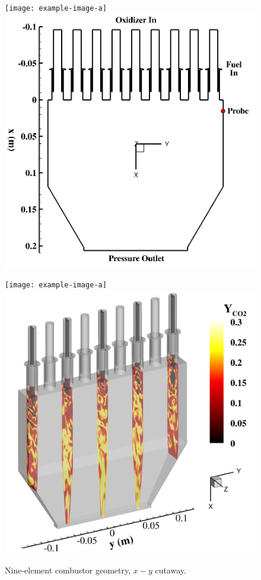\begin{figure}
	\begin{minipage}{0.49\linewidth}
		\ifdefined\DRAFT
			\texttt{[image: example-image-a]}
		\else
			\includegraphics[width=0.99\linewidth]{Chapters/HPROMResults/Images/nineElem/geom_xy.png}
		\fi
		\caption{\label{fig:nineElemGeomXY}Nine-element combustor geometry, $x-y$ cutaway.}
	\end{minipage}
	\begin{minipage}{0.49\linewidth}
		\ifdefined\DRAFT
			\texttt{[image: example-image-a]}
		\else
			\includegraphics[width=0.99\linewidth]{Chapters/HPROMResults/Images/nineElem/geom_iso.png}

\end{minipage}
\end{figure}
